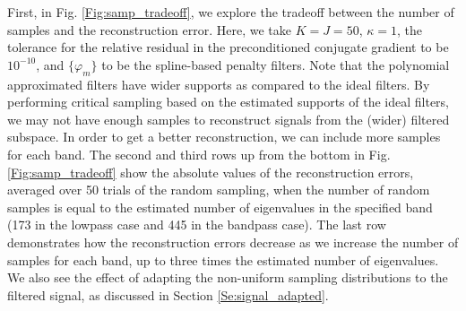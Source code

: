 \documentclass[journal, 10pt]{IEEEtran}
\begin{document}
First, in Fig. \ref{Fig:samp_tradeoff}, we explore the tradeoff between the number of samples and the reconstruction error.  Here, we take $K=J=50$, $\kappa=1$, the tolerance for the relative residual in the preconditioned conjugate gradient to be $10^{-10}$, and $\{\varphi_m\}$ to be the spline-based penalty filters.  Note that the polynomial approximated filters have wider supports as compared to the ideal filters. By performing critical sampling based on the estimated supports of the ideal filters, we may not have enough samples to reconstruct signals from the (wider) filtered subspace. %
In order to get a better reconstruction, we can include more samples for each band. The second and third rows up from the bottom in Fig. \ref{Fig:samp_tradeoff} show the absolute values of the reconstruction errors, averaged over 50 trials of the random sampling, when the number of random samples is equal to the estimated number of eigenvalues in the specified band (173 in the lowpass case and 445 in the bandpass case). The last row demonstrates how the 
reconstruction errors %
decrease as we increase the number of samples for each band, up to three times the estimated number of eigenvalues. We also see the effect of adapting the non-uniform sampling distributions to the filtered signal, as discussed in Section \ref{Se:signal_adapted}. %
\end{document}
